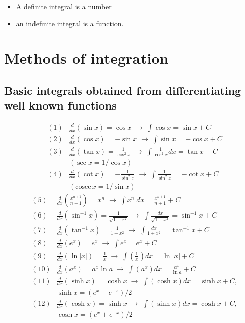 \documentclass{article}
\begin{document}
\begin{itemize}
\item
A definite integral is a number
\item
an indefinite integral is a function.
\end{itemize}


\section{Methods of integration} 
\subsection{Basic integrals obtained from differentiating well known functions}

\begin{eqnarray}
&(1)& \frac{d }{d x} \left( \sin x \right) = \cos x  \;   \to   \;
\int \cos x  = \sin x +C
\nonumber \\
&(2)& \frac{d }{d x} \left( \cos x \right) = -\sin x  \;   \to \;
\int \sin x  = -\cos x +C    \nonumber \\
&(3)& \frac{d }{d x} \left( \tan x \right) = \frac{1}{\cos^2 x}
\;   \to \;
\int \frac{1}{\cos^2 x} dx   = \tan x +C  \nonumber
\\
&&(\sec x=1/\cos x)    \nonumber \\
&(4)& \frac{d }{d x} \left( \cot x \right) = - \frac{1}{\sin^2 x}
\;   \to \;
\int \frac{1}{\sin^2 x}  = - \cot x +C  \nonumber
\\
&& (\mathrm{cosec}\, x=1/\sin x)    \nonumber 
\end{eqnarray}
\begin{eqnarray}
&(5)& \frac{d }{d x} \left( \frac{x^{n+1}}{n+1} \right) =  x^n \;
\to \;
\int x^n \; dx =  \frac{x^{n+1}}{n+1}  +C  \; \;     \nonumber \\
&(6)& \frac{d }{d x} \left( \sin^{-1} x  \right) =
\frac{1}{\sqrt{1-x^2} } \; \to \;
\int \frac{d x}{\sqrt{1-x^2} }  = \sin^{-1} x +C     \nonumber \\
&(7)& \frac{d }{d x} \left( \tan^{-1} x  \right) = \frac{1}{1+x^2}
\; \to \;
\int \frac{d x}{1+x^2 }  = \tan^{-1} x +C     \nonumber \\
&(8)& \frac{d }{d x} \left( e^x \right) = e^x  \;   \to   \; \int
e^x  = e^x +C\nonumber
\nonumber \\
&(9)& \frac{d }{d x} \left( \ln |x|  \right) =  \frac{1 }{x} \;
\to \; \int \left( \frac{1 }{x} \right) d x  = \ln |x| +C
\nonumber \\
&(10)& \frac{d }{d x} \left( a^x  \right) = a^x \ln a \; \to \;
\int \left( a^x \right) d x  = \frac{a^x}{\ln a}  +C \nonumber \\
&(11)& \frac{d }{d x} \left( \sinh x  \right) =  \cosh x \; \to \;
\int \left( \cosh x \right) d x  = \sinh x  +C, \nonumber
\\
 && \sinh x=(e^x-e^{-x})/2 \nonumber \\
 &(12)& \frac{d }{d x} \left( \cosh x \right) =
\sinh x \; \to \; \int \left( \sinh x \right) d x  = \cosh x  +C, \nonumber
\\
&& \cosh x=(e^x+e^{-x})/2 \nonumber
\end{eqnarray}
\end{document}
